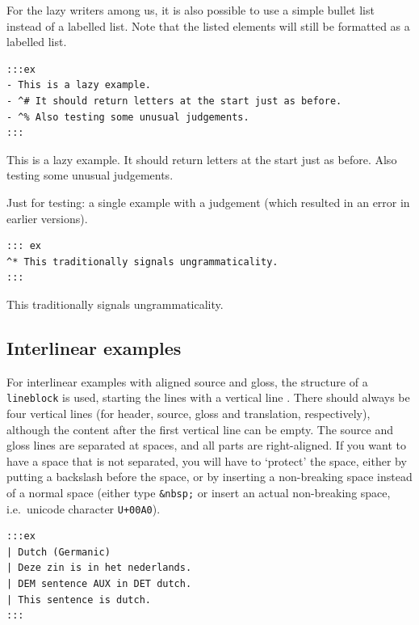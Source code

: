 \documentclass[
]{article}
\begin{document}
For the lazy writers among us, it is also possible to use a simple
bullet list instead of a labelled list. Note that the listed elements
will still be formatted as a labelled list.

\begin{verbatim}
:::ex
- This is a lazy example.
- ^# It should return letters at the start just as before.
- ^% Also testing some unusual judgements.
:::
\end{verbatim}

\begin{samepage}
  \a This is a lazy example.
  \a \ljudge{\#}It should return letters at the start just as before.
  \a \ljudge{\%}Also testing some unusual judgements.
\xe
\end{samepage}

Just for testing: a single example with a judgement (which resulted in
an error in earlier versions).

\begin{verbatim}
::: ex
^* This traditionally signals ungrammaticality.
:::
\end{verbatim}

\begin{samepage}
  
  \judge{*} This traditionally signals ungrammaticality.
\xe
\end{samepage}

\hypertarget{interlinear-examples}{%
\subsection{Interlinear examples}\label{interlinear-examples}}

For interlinear examples with aligned source and gloss, the structure of
a \texttt{lineblock} is used, starting the lines with a vertical line
\texttt{\textbar{}}. There should always be four vertical lines (for
header, source, gloss and translation, respectively), although the
content after the first vertical line can be empty. The source and gloss
lines are separated at spaces, and all parts are right-aligned. If you
want to have a space that is not separated, you will have to `protect'
the space, either by putting a backslash before the space, or by
inserting a non-breaking space instead of a normal space (either type
\texttt{\&nbsp;} or insert an actual non-breaking space, i.e.~unicode
character \texttt{U+00A0}).

\begin{verbatim}
:::ex
| Dutch (Germanic)
| Deze zin is in het nederlands.
| DEM sentence AUX in DET dutch.
| This sentence is dutch.
:::
\end{verbatim}
\end{document}
